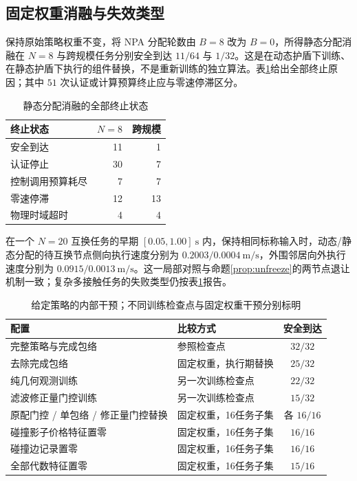 \subsection{固定权重消融与失效类型}\label{subsec:ablation}
保持原始策略权重不变，将 NPA 分配轮数由 $B=8$ 改为 $B=0$，所得静态分配消融在 $N=8$ 与跨规模任务分别安全到达 $11/64$ 与 $1/32$。这是在动态护盾下训练、在静态护盾下执行的组件替换，不是重新训练的独立算法。表\ref{tab:static-status}给出全部终止原因；其中 $51$ 次认证或计算预算终止应与零速停滞区分。

\begin{table}[t]
\centering\footnotesize
\caption{静态分配消融的全部终止状态}\label{tab:static-status}
\begin{tabular}{@{}lrr@{}}\toprule
终止状态 & $N=8$ & 跨规模\\\midrule
安全到达 & 11 & 1\\
认证停止 & 30 & 7\\
控制调用预算耗尽 & 7 & 7\\
零速停滞 & 12 & 13\\
物理时域超时 & 4 & 4\\\bottomrule
\end{tabular}
\end{table}

在一个 $N=20$ 互换任务的早期 $[0.05,1.00]\ \mathrm s$ 内，保持相同标称输入时，动态/静态分配的待互换节点侧向执行速度分别为 $0.2003/0.0004\ \mathrm{m/s}$，外围邻居向外执行速度分别为 $0.0915/0.0013\ \mathrm{m/s}$。这一局部对照与命题\ref{prop:unfreeze}的两节点退让机制一致；复杂多接触任务的失败类型仍按表\ref{tab:static-status}报告。

\begin{table}[t]
\centering\footnotesize
\caption{给定策略的内部干预；不同训练检查点与固定权重干预分别标明}\label{tab:decomp}
\begin{tabularx}{\textwidth}{@{}Xlc@{}}\toprule
配置 & 比较方式 & 安全到达\\\midrule
完整策略与完成包络 & 参照检查点 & $32/32$\\
去除完成包络 & 固定权重，执行期替换 & $25/32$\\
纯几何观测训练 & 另一次训练检查点 & $22/32$\\
滤波修正量门控训练 & 另一次训练检查点 & $15/32$\\\midrule
原配门控 / 单包络 / 修正量门控替换 & 固定权重，16任务子集 & 各 $16/16$\\
碰撞影子价格特征置零 & 固定权重，16任务子集 & $16/16$\\
碰撞边记录置零 & 固定权重，16任务子集 & $16/16$\\
全部代数特征置零 & 固定权重，16任务子集 & $15/16$\\\bottomrule
\end{tabularx}
\end{table}

